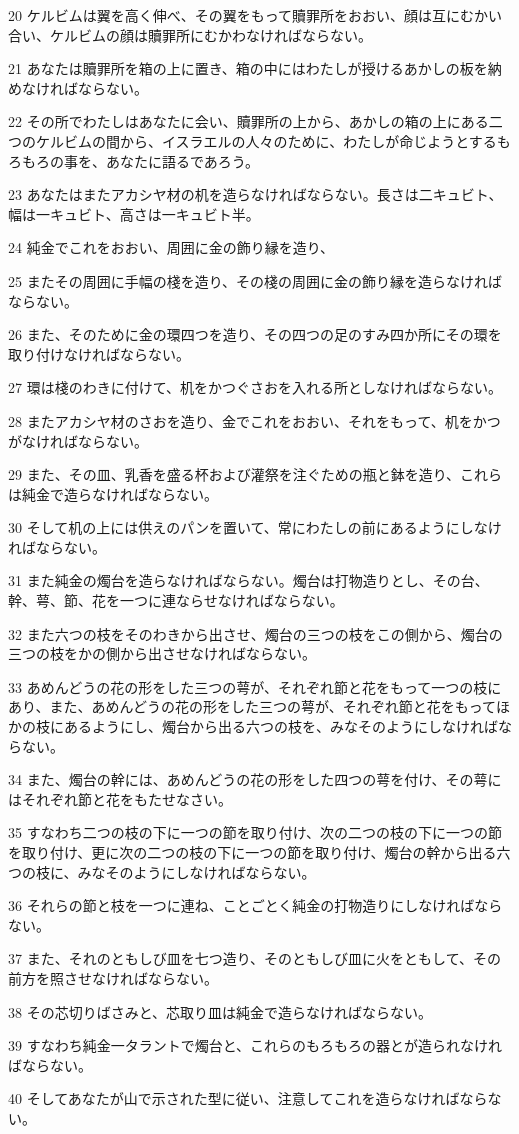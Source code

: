 \par 20 ケルビムは翼を高く伸べ、その翼をもって贖罪所をおおい、顔は互にむかい合い、ケルビムの顔は贖罪所にむかわなければならない。
\par 21 あなたは贖罪所を箱の上に置き、箱の中にはわたしが授けるあかしの板を納めなければならない。
\par 22 その所でわたしはあなたに会い、贖罪所の上から、あかしの箱の上にある二つのケルビムの間から、イスラエルの人々のために、わたしが命じようとするもろもろの事を、あなたに語るであろう。
\par 23 あなたはまたアカシヤ材の机を造らなければならない。長さは二キュビト、幅は一キュビト、高さは一キュビト半。
\par 24 純金でこれをおおい、周囲に金の飾り縁を造り、
\par 25 またその周囲に手幅の棧を造り、その棧の周囲に金の飾り縁を造らなければならない。
\par 26 また、そのために金の環四つを造り、その四つの足のすみ四か所にその環を取り付けなければならない。
\par 27 環は棧のわきに付けて、机をかつぐさおを入れる所としなければならない。
\par 28 またアカシヤ材のさおを造り、金でこれをおおい、それをもって、机をかつがなければならない。
\par 29 また、その皿、乳香を盛る杯および灌祭を注ぐための瓶と鉢を造り、これらは純金で造らなければならない。
\par 30 そして机の上には供えのパンを置いて、常にわたしの前にあるようにしなければならない。
\par 31 また純金の燭台を造らなければならない。燭台は打物造りとし、その台、幹、萼、節、花を一つに連ならせなければならない。
\par 32 また六つの枝をそのわきから出させ、燭台の三つの枝をこの側から、燭台の三つの枝をかの側から出させなければならない。
\par 33 あめんどうの花の形をした三つの萼が、それぞれ節と花をもって一つの枝にあり、また、あめんどうの花の形をした三つの萼が、それぞれ節と花をもってほかの枝にあるようにし、燭台から出る六つの枝を、みなそのようにしなければならない。
\par 34 また、燭台の幹には、あめんどうの花の形をした四つの萼を付け、その萼にはそれぞれ節と花をもたせなさい。
\par 35 すなわち二つの枝の下に一つの節を取り付け、次の二つの枝の下に一つの節を取り付け、更に次の二つの枝の下に一つの節を取り付け、燭台の幹から出る六つの枝に、みなそのようにしなければならない。
\par 36 それらの節と枝を一つに連ね、ことごとく純金の打物造りにしなければならない。
\par 37 また、それのともしび皿を七つ造り、そのともしび皿に火をともして、その前方を照させなければならない。
\par 38 その芯切りばさみと、芯取り皿は純金で造らなければならない。
\par 39 すなわち純金一タラントで燭台と、これらのもろもろの器とが造られなければならない。
\par 40 そしてあなたが山で示された型に従い、注意してこれを造らなければならない。

